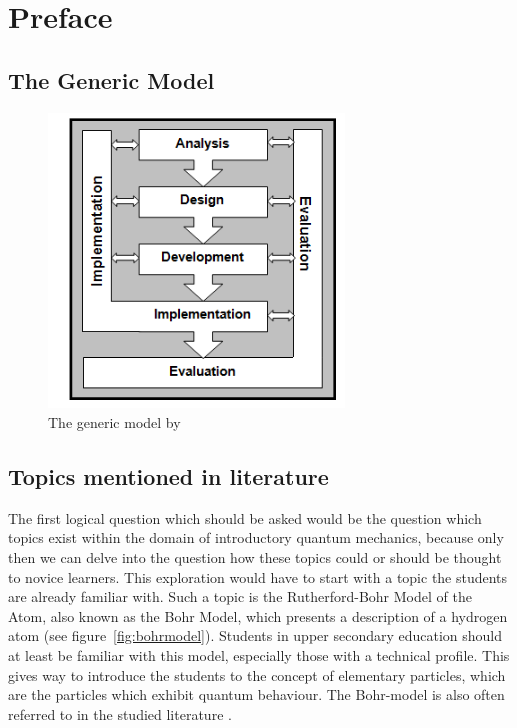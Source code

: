 \documentclass[11pt,twoside]{report} %
\begin{document}
\section{Preface}


\subsection{The Generic Model}

\begin{figure}[h]
\centering
\includegraphics[width=0.7\textwidth]{genericmodel}
\caption{The generic model by \protect{}\label{fig:genericmodel}}
\end{figure}

\subsection{Topics mentioned in literature}
\label{sssec:topicsliterature}

The first logical question which should be asked would be the question which topics exist within the domain of introductory quantum mechanics, because only then we can delve into the question how these topics could or should be thought to novice learners. This exploration would have to start with a topic the students are already familiar with. Such a topic is the Rutherford-Bohr Model of the Atom, also known as the Bohr Model, which presents a description of a hydrogen atom (see figure~\ref{fig:bohrmodel}). Students in upper secondary education should at least be familiar with this model, especially those with a technical profile. This gives way to introduce the students to the concept of elementary particles, which are the particles which exhibit quantum behaviour. The Bohr-model is also often referred to in the studied literature \cite{dori, mckagan, muller, papaphotis1, papaphotis2}.
\end{document}
